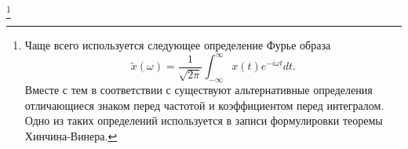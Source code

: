 \footnote{
Чаще всего используется следующее определение Фурье образа
\[
\tilde{x}\left(\omega\right) = \frac{1}{\sqrt{2 \pi}}
\int_{-\infty}^{\infty}x\left(t\right)e^{-i \omega t}dt.
\]
Вместе с тем в соответствии с \cite{wiki:fourier_transform} существуют
альтернативные определения отличающиеся знаком перед частотой и
коэффициентом перед интегралом. Одно из таких определений используется
в записи формулировки теоремы Хинчина-Винера.
}
